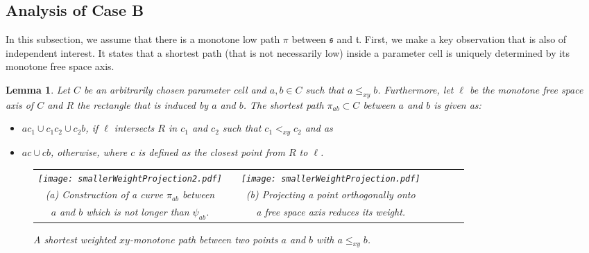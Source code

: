 \documentclass[a4paper,11pt]{article}
\newtheorem{lemma}{Lemma}
\begin{document}
\subsection{Analysis of Case B}\label{subsubsec:anaG2}
 In this subsection, we assume that there is a monotone low path $\pi$ between $\mathfrak{s}$ and $\mathfrak{t}$. 
First, we make a key observation that is also of independent interest. It states that a shortest path (that is not necessarily low) inside a parameter cell is uniquely determined by its monotone free space axis.
\begin{lemma}\label{lem:key}
	Let $C$ be an arbitrarily chosen parameter cell and $a, b \in C$ such that $a \leq_{xy} b$. Furthermore, let $\ell$ be the monotone free space axis of $C$ and $R$ the rectangle that is induced by $a$ and $b$. The shortest path $\pi_{ab} \subset C$ between $a$ and $b$ is given as:
		\begin{itemize}
			 \item  $ac_1 \cup c_1c_2 \cup c_2b$, if $\ell$ intersects $R$ in $c_1$ and $c_2$ such that $c_1 <_{xy} c_2$ and as
			\item $ac \cup cb$, otherwise, where $c$ is defined as the closest point from $R$ to $\ell$.
		\end{itemize}
		
\begin{figure}[ht]
  \begin{center}
    \begin{tabular}{ccccccc}
      \texttt{[image: smallerWeightProjection2.pdf]} & &
       \texttt{[image: smallerWeightProjection.pdf]}&&\\ 
{\small (a) Construction of a curve $\pi_{ab}$ between} & &
      {\small (b) Projecting a point orthogonally onto}&&\\
      {\small $a$ and $b$ which is not longer than $\psi_{ab}$.}&&
      {\small a free space axis reduces its weight.}&&
    \end{tabular}
  \end{center}
  \vspace*{-12pt}
  \caption{A shortest weighted $xy$-monotone path between two points $a$ and $b$ with $a \leq_{xy} b$.}
  \label{fig:smallerWeightProjection}
\end{figure}
		
\end{lemma}
\end{document}
